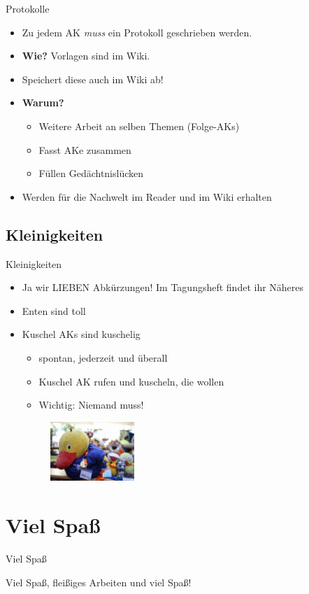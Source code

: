 \documentclass[compress,]{beamer}
\begin{document}
\begin{frame}{Protokolle}

  \begin{itemize}[<+->]
  \item Zu jedem AK \emph{muss} ein Protokoll geschrieben werden.
  \item \textbf{Wie?} Vorlagen sind im Wiki.

  \item Speichert diese auch im Wiki ab!
  \item \textbf{Warum?}
    \begin{itemize}
    \item Weitere Arbeit an selben Themen (Folge-AKs)
    \item Fasst AKe zusammen
    \item Füllen Gedächtnislücken
    \end{itemize}
  \item Werden für die Nachwelt im Reader und im Wiki erhalten
  \end{itemize}

\end{frame}



\subsection{Kleinigkeiten}

\begin{frame}{Kleinigkeiten}

\begin{itemize}[<+->]
	\item Ja wir LIEBEN Abkürzungen! Im Tagungsheft findet ihr Näheres
	\item Enten sind toll
	\item Kuschel AKs sind kuschelig
	\begin{itemize}
		\item spontan, jederzeit und überall
		\item Kuschel AK rufen und kuscheln, die wollen
		\item Wichtig: Niemand muss!
	\end{itemize}
	\begin{figure}
		\centering
		\includegraphics[width=0.3\textwidth]{Ente.pdf}
	\end{figure}
	
\end{itemize}
\end{frame}

\section{Viel Spaß}

\begin{frame}{Viel Spaß}

Viel Spaß, fleißiges Arbeiten und viel Spaß!

\end{frame}
\end{document}
